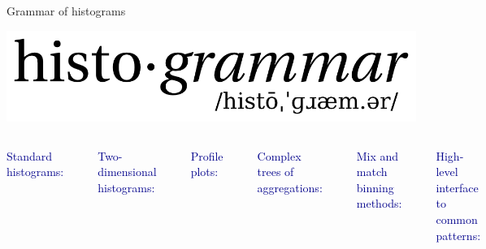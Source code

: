 \documentclass{beamer}
\begin{document}
\begin{frame}[fragile]{Grammar of histograms}
\begin{center}
\includegraphics[width=0.5\linewidth]{histogrammar-logo.png}
\end{center}
\tiny
\begin{columns}
\textcolor{darkblue}{\scriptsize Standard histograms:}
\begin{verbatim}
Bin(num, low, high, fillRule, Count())
\end{verbatim}

\vspace{0.25 cm}
\textcolor{darkblue}{\scriptsize Two-dimensional histograms:}
\begin{verbatim}
Bin(xnum, xlow, xhigh, "x",
  Bin(ynum, ylow, yhigh, "y",
    Count()))
\end{verbatim}

\vspace{0.25 cm}
\textcolor{darkblue}{\scriptsize Profile plots:}
\begin{verbatim}
Bin(xnum, xlow, xhigh, "y",
  Deviate("y"))

Bin(xnum, xlow, xhigh, "x",
  Bin(ynum, ylow, yhigh, "y",
    Average("z")))
\end{verbatim}

\vspace{0.25 cm}
\textcolor{darkblue}{\scriptsize Complex trees of aggregations:}
\begin{verbatim}
Bin(xnum, xlow, xhigh, "x",
  Branch(Minimize("y"),
         Maximize("y"),
         Average("y"),
         Sum("weight"),
         Sum("weight * weight")))
\end{verbatim}

\textcolor{darkblue}{\scriptsize Mix and match binning methods:}
\begin{verbatim}
IrregularlyBin([-2.4, -2.1, -1.5,
    0.0, 1.5, 2.1, 2.4], "eta",
  Bin(314, -3.14, 3.14, "phi",
    Count()))

# don't allocate if zero
SparselyBin(0.01, "eta",
  Bin(314, -3.14, 3.14, "phi",
    Count()))

# bin by strings (bar chart)
Categorize(fillByName,
  Bin(314, -3.14, 3.14, "phi",
    Count()))
\end{verbatim}

\vspace{0.25 cm}
\textcolor{darkblue}{\scriptsize High-level interface to common patterns:}

\vspace{-0.1 cm}
\begin{verbatim}
# efficiency plot
Fraction("numHits > 5",
  Bin(numBins, lowEdge, highEdge, "pt"))

# stack of plots with different cuts
Stack([5.0, 10.0, 30.0, 50.0, 100.0], "pt",
  Bin(numBins, lowEdge, highEdge, "numHits"))
\end{verbatim}
\end{columns}
\end{frame}
\end{document}
